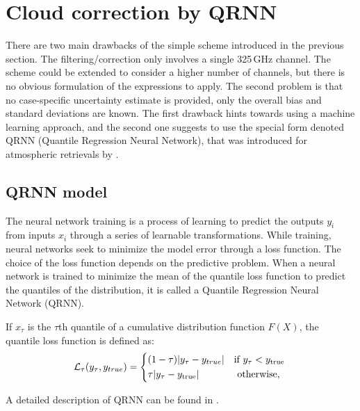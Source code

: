 \documentclass[12pt]{article}
\begin{document}
\section{Cloud correction by QRNN}
%
\label{sec:qrnn}
There are two main drawbacks of the simple scheme introduced in the previous
section. The filtering/correction only involves a single 325\,GHz channel. The
scheme could be extended to consider a higher number of channels, but there is
no obvious formulation of the expressions to apply. The second problem is that
no case-specific uncertainty estimate is provided, only the overall bias and
standard deviations are known. The first drawback hints towards using a machine
learning approach, and the second one suggests to use the special form denoted
QRNN (Quantile Regression Neural Network), that was introduced for atmospheric
retrievals by \citet{pfreundschuh:aneur:18}.

\subsection{QRNN model}
%
The neural network training is a process of learning to predict the outputs {$y_i$} from inputs {$x_i$} through a series of learnable transformations. While training, neural networks seek to minimize the model error through a loss function. The choice of the loss function depends on the predictive problem. When a neural network is trained to minimize the mean of the quantile loss function to predict the quantiles of the distribution, it is called a Quantile Regression Neural Network (QRNN). 

If $x_{\tau}$ is the $\tau$th quantile of a cumulative distribution function $F(X)$, the quantile loss function is defined as:
\begin{equation}
\mathcal{L}_\tau(y_\tau, y_{true}) =
\begin{cases*}
(1 - \tau)|y_\tau - y_{true}| &\text{if}  $y_\tau < y_\text{true}$\\
\tau |y_\tau - y_\text{true}| & \text{ otherwise, }
\end{cases*}
\label{loss_function}
\end{equation}

A detailed description of QRNN can be found in \citet{pfreundschuh:aneur:18}.  
\end{document}
